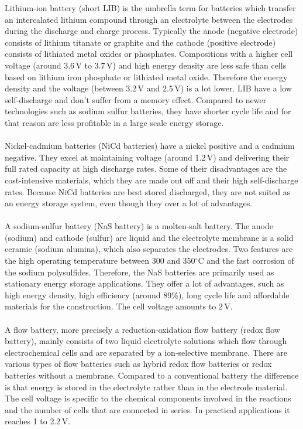 \begin{parcolumns}[colwidths={1=2.5 cm, 2=10 cm, 3=2.5cm}]{3}
{Lithium-ion battery (short LIB) is the umbrella term for batteries which transfer an intercalated lithium compound through an electrolyte between the electrodes during the discharge and charge process. Typically the anode (negative electrode) consists of lithium titanate or graphite and the cathode (positive electrode) consists of lithiated metal oxides or phosphates. Compositions with a higher cell voltage (around 3.6\,V to 3.7\,V) and high energy density are less safe than cells based on lithium iron phosphate or lithiated metal oxide. Therefore the energy density and the voltage (between 3.2\,V and 2.5\,V) is a lot lower. LIB have a low self-discharge and don't suffer from a memory effect. Compared to newer technologies such as sodium sulfur batteries, they have shorter cycle life and for that reason are less profitable in a large scale energy storage.\\\\ Nickel-cadmium batteries (NiCd batteries) have a nickel positive and a cadmium negative. They excel at maintaining voltage (around 1.2\,V)  and delivering their full rated capacity at high discharge rates. Some of their disadvantages are the cost-intensive materials, which they are made out off and their high self-discharge rates. Because NiCd batteries are best stored discharged, they are not suited as an energy storage system, even though they over a lot of advantages.\\\\A sodium-sulfur battery (NaS battery) is a molten-salt battery. The anode (sodium) and cathode (sulfur) are liquid and the electrolyte membrane is a solid ceramic (sodium alumina), which also separates the electrodes. Two features are the high operating temperature between 300 and 350$^\circ$C  and the fast corrosion of the sodium polysulfides. Therefore, the NaS batteries are primarily used as stationary energy storage applications. They offer a lot of advantages, such as high energy density, high efficiency (around 89$\%$), long cycle life and affordable materials for the construction. The cell voltage amounts to 2\,V.
\\\\A flow battery, more precisely a reduction-oxidation flow battery (redox flow battery), mainly consists of two liquid electrolyte solutions which flow through electrochemical cells and are separated by a ion-selective membrane. There are various types of flow batteries such as hybrid redox flow batteries or redox batteries without a membrane. Compared to a conventional battery the difference is that energy is stored in the electrolyte rather than in the electrode material. The cell voltage is specific to the chemical components involved in the reactions and the number of cells that are connected in series. In practical applications it reaches 1 to 2.2\,V. 
}
\end{parcolumns}
